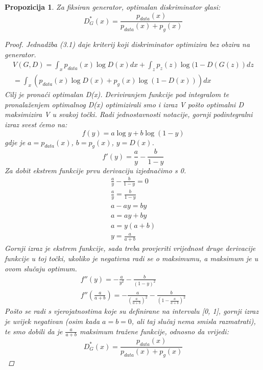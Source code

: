 \documentclass[times, utf8, diplomski]{fer}
\newtheorem{prop}{Propozicija}
\begin{document}
\begin{prop}
Za fiksiran generator, optimalan diskriminator glasi:
\begin{equation}
D_G^*(x) = \frac{p_{data}(x)}{p_{data}(x) + p_g(x)}
\end{equation}
\begin{proof}
Jednadžba (3.1) daje kriterij koji diskriminator optimizira bez obzira na generator.
\begin{gather}
V(G,D) = \int_x p_{data}(x) \log D(x)dx + \int_z p_{z}(z) \log (1 - D(G(z))dz \\ 
\nonumber = \int_x (p_{data}(x) \log D(x) + p_{g}(x) \log (1 - D(x)))dx
\end{gather}
Cilj je pronaći optimalan D(x). Deriviranjem funkcije pod integralom te pronalaženjem optimalnog D(x) optimizirali smo i izraz V pošto optimalni D maksimizira V u svakoj točki. Radi jednostavnosti notacije, gornji podintegralni izraz svest ćemo na:
\begin{equation}
f(y) = a\log y + b\log (1-y)
\end{equation}
gdje je $a=p_{data}(x)$, $b=p_g(x)$, $y=D(x)$.
\begin{equation}
f'(y) = \frac{a}{y} - \frac{b}{1-y}
\end{equation}
Za dobit ekstrem funkcije prvu derivaciju izjednačimo s 0.
\begin{gather}
\frac{a}{y} - \frac{b}{1-y} = 0 \\
\nonumber\frac{a}{y} = \frac{b}{1-y} \\
\nonumber a - ay = by \\
\nonumber a = ay + by \\
\nonumber a = y(a+b) \\
\nonumber y = \frac{a}{a+b}
\end{gather}
Gornji izraz je ekstrem funkcije, sada treba provjeriti vrijednost druge derivacije funkcije u toj točki, ukoliko je negativna radi se o maksimumu, a maksimum je u ovom slučaju optimum.
\begin{gather}
f''(y) = - \frac{a}{y^2} - \frac{b}{(1-y)^2} \\
\nonumber f''\left(\frac{a}{a+b}\right) = - \frac{a}{\left(\frac{a}{a+b}\right)^2} - \frac{b}{(1-\frac{a}{a+b})^2}
\end{gather}
Pošto se radi s vjerojatnostima koje su definirane na intervalu [0, 1], gornji izraz je uvijek negativan (osim kada $a=b=0$, ali taj slučaj nema smisla razmatrati), te smo dobili da je $\frac{a}{a+b}$ maksimum tražene funkcije, odnosno da vrijedi:
\begin{equation}
D_G^*(x) = \frac{p_{data}(x)}{p_{data}(x) + p_g(x)}
\end{equation}
\end{proof}
\end{prop}
\end{document}
